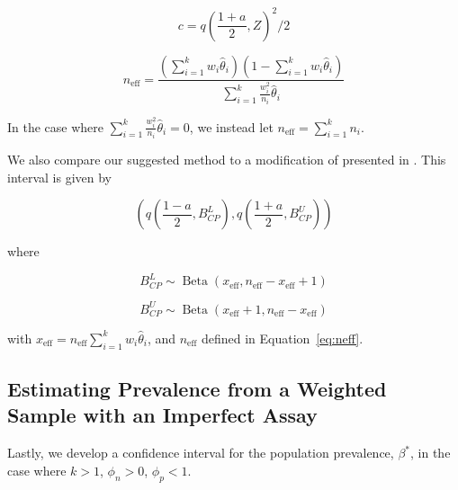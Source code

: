 \documentclass[AMA,STIX1COL]{WileyNJD-v2}
\begin{document}
\begin{equation}
   c = q\left( \frac{1 + a}{2}, Z \right)^2/2 
\end{equation}

\begin{equation}
   n_{\text{eff}} = \frac{\left( \sum_{i=1}^k w_i \hat{\theta}_i \right) \left(1 - \sum_{i=1}^k w_i \hat{\theta}_i \right)}{\sum_{i=1}^k \frac{w_i^2}{n_i}\hat{\theta}_i} 
   \label{eq:neff}
\end{equation}
 
In the case where \( \sum_{i=1}^k \frac{w_i^2}{n_i}\hat{\theta}_i = 0 \), we instead let \( n_{\text{eff}} = \sum_{i=1}^k n_i \).

We also compare our suggested method to a modification of \cite{Korn:1998} presented in \cite{Dean:2015}.
This interval is given by 

\begin{equation}
    \left( q \left( \frac{1 - a}{2}, B^L_{CP} \right), q \left( \frac{1 + a}{2}, B^U_{CP} \right)  \right)
\end{equation}

where 

\begin{equation}
    B^L_{CP} \sim \operatorname{Beta}\left(x_{\text{eff}},  n_{\text{eff}} -  x_{\text{eff}} + 1 \right)
\end{equation}

\begin{equation}
    B^U_{CP} \sim \operatorname{Beta}\left(x_{\text{eff}} + 1, n_{\text{eff}} - x_{\text{eff}} \right)
\end{equation}

with \( x_{\text{eff}} = n_{\text{eff}} \sum_{i=1}^k w_i \hat{\theta}_i \), and \( n_{\text{eff}} \) defined in Equation~\ref{eq:neff}.

\subsection{Estimating Prevalence from a Weighted Sample with an Imperfect Assay}

Lastly, we develop a confidence interval for the population prevalence, \( \beta^* \), in the case where \( k > 1 \), \( \phi_n > 0 \), \( \phi_p < 1 \).
\end{document}

